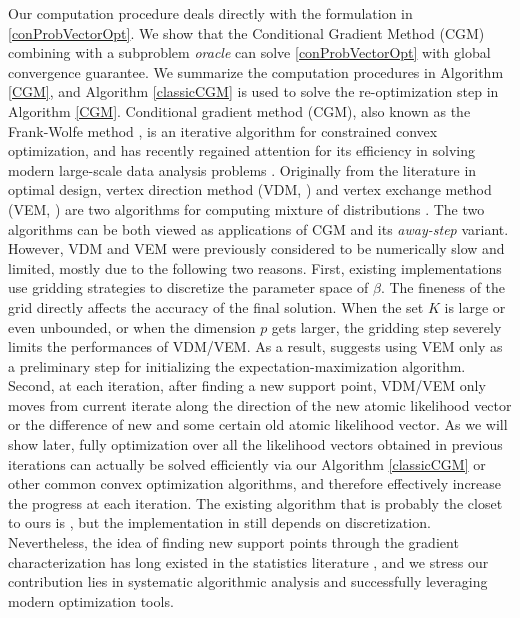 \documentclass[11pt]{article}
\numberwithin{equation}{section}
\newcommand{\EM}{expectation-maximization }
\begin{document}
Our computation procedure deals directly with the formulation in \eqref{conProbVectorOpt}. We show that the Conditional Gradient Method (CGM) combining with a subproblem \emph{oracle} can solve \eqref{conProbVectorOpt} with global convergence guarantee. We summarize the computation procedures in Algorithm \ref{CGM}, and Algorithm \ref{classicCGM} is used to solve the re-optimization step in Algorithm \ref{CGM}. Conditional gradient method (CGM), also known as the Frank-Wolfe method \citep{frank1956algorithm}, is an iterative algorithm for constrained convex optimization, and has recently regained attention for its efficiency in solving modern large-scale data analysis problems \citep{jaggi2013revisiting}. Originally from the literature in optimal design, vertex direction method (VDM, \citet{wu1978some}) and vertex exchange method (VEM, \citet{bohning1986vertex}) are two algorithms for computing mixture of distributions \citep{bohning2000computer}. The two algorithms can be both viewed as applications of CGM and its \emph{away-step} variant. However, VDM and VEM were previously considered to be numerically slow and limited, mostly due to the following two reasons. First, existing implementations use gridding strategies to discretize the parameter space of $\beta$. The fineness of the grid directly affects the accuracy of the final solution. When the set $K$ is large or even unbounded, or when the dimension $p$ gets larger, the gridding step severely limits the performances of VDM/VEM. As a result, \citet[Chapter 3.4]{bohning2000computer} suggests using VEM only as a preliminary step for initializing the \EM algorithm. Second, at each iteration, after finding a new support point, VDM/VEM only moves from current iterate along the direction of the new atomic likelihood vector or the difference of new and some certain old atomic likelihood vector. As we will show later, fully optimization over all the likelihood vectors obtained in previous iterations can actually be solved efficiently via our Algorithm \ref{classicCGM} or other common convex optimization algorithms, and therefore effectively increase the progress at each iteration. The existing algorithm that is probably the closet to ours is \citet{mallet1986maximum}, but the implementation in \citet{mallet1986maximum} still depends on discretization. Nevertheless, the idea of finding new support points through the gradient characterization has long existed in the statistics literature \citep[Chapter 5]{lindsay1995mixture}, and we stress our contribution lies in systematic algorithmic analysis and successfully leveraging modern optimization tools.
\end{document}
